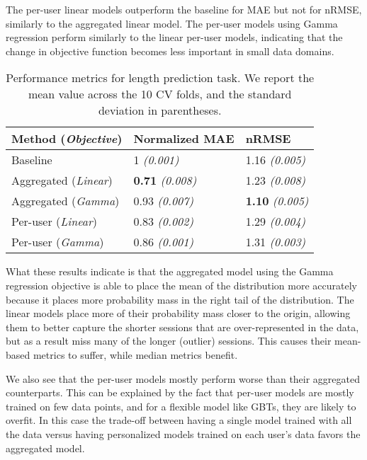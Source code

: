 The per-user linear models outperform the baseline for MAE but not for nRMSE, similarly to the aggregated linear model.
The per-user models using Gamma regression perform similarly to the linear per-user models,
indicating that the change in objective function becomes less important in small data domains.


\begin{table}
	\caption{Performance metrics for length prediction task. We report the
		mean value across the 10 CV folds, and the standard deviation in parentheses.}
	\label{tab:prediction-metrics}
	\begin{tabular}{lll}
		\toprule
		Method (\textit{Objective}) & Normalized MAE & nRMSE \\
		\midrule
		Baseline & 1 \textit{(0.001)} & 1.16 \textit{(0.005)} \\
		Aggregated (\textit{Linear}) & \textbf{0.71} \textit{(0.008)} & 1.23 \textit{(0.008)} \\
		Aggregated (\textit{Gamma}) & 0.93 \textit{(0.007)} & \textbf{1.10} \textit{(0.005)} \\
		Per-user (\textit{Linear}) & 0.83 \textit{(0.002)} & 1.29 \textit{(0.004)} \\
		Per-user (\textit{Gamma}) & 0.86 \textit{(0.001)} & 1.31 \textit{(0.003)} \\
		\bottomrule
	\end{tabular}
\end{table}

What these results indicate is that
the aggregated model using the Gamma regression objective is able to place the mean of the distribution more accurately because it
places more probability mass in the right tail of the distribution. The linear models place more of their probability mass closer
to the origin, allowing them to better capture the shorter sessions that are over-represented in the data, but as
a result miss many of the longer (outlier) sessions. This causes their mean-based metrics to suffer, while median metrics
benefit.

We also see that the per-user models mostly perform worse than their aggregated counterparts. This can be explained by the
fact that per-user models are mostly trained on few data points, and for a flexible model like GBTs, they are likely to
overfit. In this case the trade-off between having a single model trained with all the data versus
having personalized models trained on each user's data favors the aggregated model.